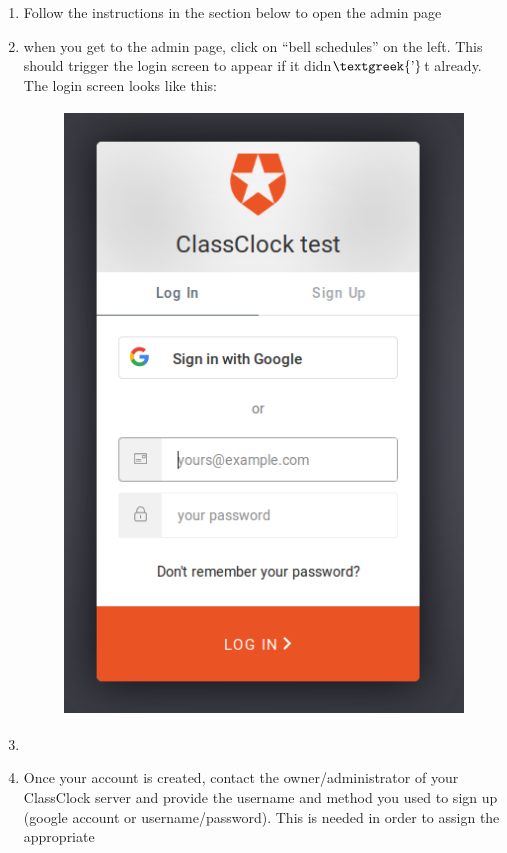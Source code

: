\documentclass{article}
\begin{document}
\begin{enumerate}
\item {
Follow the instructions in the section below to open the admin page}
\item {
when you get to the admin page, click on “bell schedules” on the left. This should trigger the login screen to appear if
it didn$\text{\textgreek{’}}$t already. The login screen looks like this:\newline
}
\begin{figure}
\includegraphics[width=4.2181in,height=6.322in]{Mini20Manual-img005.png}\end{figure}
\item {}
\item {
Once your account is created, contact the owner/administrator of your ClassClock server and provide the username and
method you used to sign up (google account or username/password). This is needed in order to assign the appropriate
}
\end{enumerate}
\end{document}
